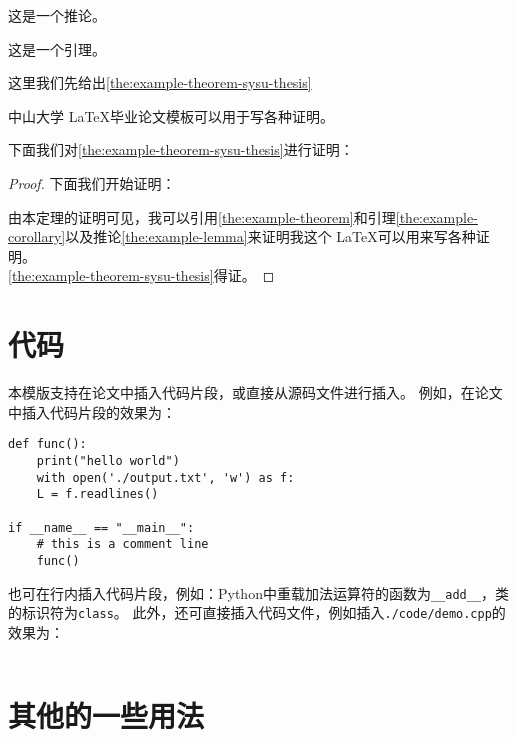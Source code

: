 \begin{corollary}[推论例子]
    \label{the:example-corollary}
    这是一个推论。
\end{corollary}

\begin{lemma}[引理例子]
    \label{the:example-lemma}
    这是一个引理。
\end{lemma}

这里我们先给出\autoref{the:example-theorem-sysu-thesis}

\begin{theorem}[中山大学毕业论文模板定理]
    \label{the:example-theorem-sysu-thesis}
    中山大学 \LaTeX 毕业论文模板\cite{sysu-thesis}可以用于写各种证明。
\end{theorem}

下面我们对\autoref{the:example-theorem-sysu-thesis}进行证明：


\begin{proof}

    下面我们开始证明：

    由本定理的证明可见，我可以引用\autoref{the:example-theorem}和引理\ref{the:example-corollary}以及推论\ref{the:example-lemma}来证明我这个 \LaTeX 可以用来写各种证明。 \\

    \autoref{the:example-theorem-sysu-thesis}得证。
\end{proof}

\section{代码}

本模版支持在论文中插入代码片段，或直接从源码文件进行插入。
例如，在论文中插入代码片段的效果为：

\begin{verbatim}
def func():
    print("hello world")
    with open('./output.txt', 'w') as f:
    L = f.readlines()

if __name__ == "__main__":
    # this is a comment line
    func()
\end{verbatim}

也可在行内插入代码片段，例如：Python中重载加法运算符的函数为\texttt{__add__}，类的标识符为\texttt{class}。
此外，还可直接插入代码文件，例如插入\texttt{./code/demo.cpp}的效果为：

\inputminted{cpp}{code/demo.cpp}

\section{其他的一些用法}
\label{sec:font}
